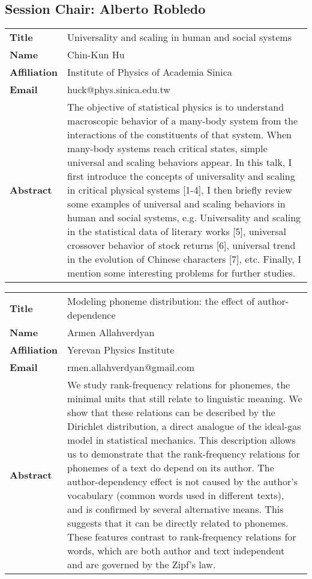 \documentclass[oneside,A4paper,12pt]{article}
\begin{document}
\newpage

\subsection*{Session \uppercase\expandafter{}  \hspace{10mm} Chair: Alberto Robledo}
\label{sec:orge5da119}
\begin{longtable}{p{2cm}p{14cm}}
\toprule
\textbf{Title} & Universality and scaling in human and social systems\\
\textbf{Name} & Chin-Kun Hu\\
\textbf{Affiliation} & Institute of Physics of Academia Sinica\\
\textbf{Email} & huck@phys.sinica.edu.tw\\
\textbf{Abstract} & The objective of statistical physics is to understand macroscopic behavior of a many-body system from the interactions of the constituents of that system. When many-body systems reach critical states, simple universal and scaling behaviors appear. In this talk, I first introduce the concepts of universality and scaling in critical physical systems [1-4], I then briefly review some examples of universal and scaling behaviors in human and social systems, e.g. Universality and scaling in the statistical data of literary works [5], universal crossover behavior of stock returns [6], universal trend in the evolution of Chinese characters [7], etc. Finally, I mention some interesting problems for further studies.\\
\bottomrule
\end{longtable}


\newpage

\begin{longtable}{p{2cm}p{14cm}}
\toprule
\textbf{Title} & Modeling phoneme distribution: the effect of author-dependence\\
\textbf{Name} & Armen Allahverdyan\\
\textbf{Affiliation} & Yerevan Physics Institute\\
\textbf{Email} & rmen.allahverdyan@gmail.com\\
\textbf{Abstract} & We study rank-frequency relations for phonemes, the minimal units that still relate to linguistic meaning. We show that these relations can be described by the Dirichlet distribution, a direct analogue of the ideal-gas model in statistical mechanics. This description allows us to demonstrate that the rank-frequency relations for phonemes of a text do depend on its author. The author-dependency effect is not caused by the author’s vocabulary (common words used in different texts), and is confirmed by several alternative means. This suggests that it can be directly related to phonemes. These features contrast to rank-frequency relations for words, which are both author and text independent and are governed by the Zipf’s law.\\
\bottomrule
\end{longtable}
\end{document}
